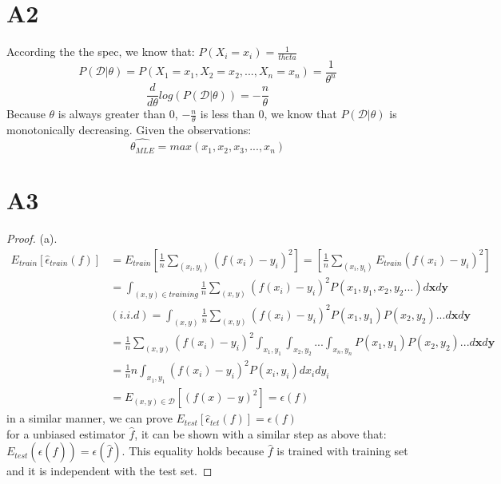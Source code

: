 \documentclass[12pt]{article}
\begin{document}
\section*{A2}
According the the spec, we know that: $P(X_i=x_i) = \frac{1}{theta}$
$$P(\mathcal{D} | \theta) = P(X_1=x_1, X_2=x_2,...,X_n=x_n ) = \frac{1}{\theta^n}$$
$$\frac{d}{d\theta}log(P(\mathcal{D} | \theta)) = -\frac{n}{\theta}$$
Because $\theta$ is always greater than 0, $-\frac{n}{\theta}$ is less than 0, we know that $P(\mathcal{D} | \theta)$ is monotonically decreasing. Given the observations: 
$$\widehat{\theta_{MLE}} =max(x_1,x_2,x_3,...,x_n) $$

\newpage

\section*{A3}
\begin{proof}
        (a).\\
        \[
\begin{aligned}
        E_{train}[\widehat{\epsilon}_{train}(f) ] &= E_{train}[\frac{1}{n} \sum_{(x_i,y_i)} (f(x_i)-y_i)^2 ] =[\frac{1}{n} \sum_{(x_i,y_i)} E_{train}(f(x_i)-y_i)^2 ]  \\
                                                  &= \int_{(x,y)\in training}\frac{1}{n} \sum_{(x,y)} (f(x_i)-y_i)^2  P(x_1,y_1,x_2,y_2...)d\mathbf{x}d\mathbf{y}\\ 
                                                  &(i.i.d)=  \int_{(x,y)}\frac{1}{n} \sum_{(x,y)} (f(x_i)-y_i)^2  P(x_1,y_1)P(x_2,y_2)...d\mathbf{x}d\mathbf{y}\\ 
                                                  &=  \frac{1}{n} \sum_{(x,y)} (f(x_i)-y_i)^2  \int_{x_1,y_1} \int_{x_2,y_2}...\int_{x_n,y_n} P(x_1,y_1)P(x_2,y_2)...d\mathbf{x}d\mathbf{y}\\ 
                                                  &=  \frac{1}{n} n \int_{x_1,y_1}   (f(x_i)-y_i)^2  P(x_i,y_i)dx_idy_i\\ 
                                                  & = E_{(x,y) \in \mathcal{D}} [(f(x)-y)^2] = \epsilon(f)
\end{aligned}
        \]
in a similar manner, we can prove $E_{test}[\widehat{\epsilon}_{tet}(f)] = \epsilon(f)$ \\ 

\noindent for a unbiased estimator $\widehat{f}$, it can be shown with a similar step as above that: $E_{test}(\epsilon(\widehat{f})) = \epsilon(\widehat{f})$. This equality holds because $\widehat{f}$ is trained with training set and it is independent with the test set.
\end{proof}
\end{document}
